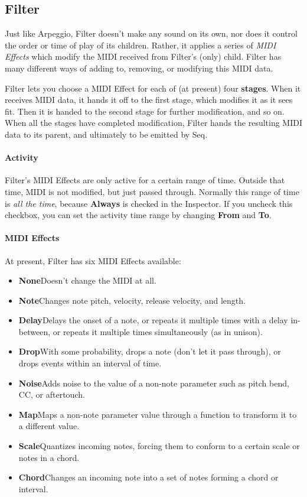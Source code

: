 \documentclass[twoside,10pt]{article}
\begin{document}
\subsection{Filter}

Just like Arpeggio, Filter doesn't make any sound on its own, nor does it control the order or time of play of its children.  Rather, it applies a series of {\it MIDI Effects} which modify the MIDI received from Filter's (only) child.  Filter has many different ways of adding to, removing, or modifying this MIDI data.  

Filter lets you choose a MIDI Effect for each of (at present) four {\bf stages}.  When it receives MIDI data, it hands it off to the first stage, which modifies it as it sees fit.  Then it is handed to the second stage for further modification, and so on.  When all the stages have completed modification, Filter hands the resulting MIDI data to its parent, and ultimately to be emitted by Seq.

\paragraph{Activity}

Filter's MIDI Effects are only active for a certain range of time.  Outside that time, MIDI is not modified, but just passed through.   Normally this range of time is {\it all the time}, because {\bf Always} is checked in the Inspector.  If you uncheck this checkbox, you can set the activity time range by changing {\bf From} and {\bf To}.  

\paragraph{MIDI Effects}

At present, Filter has six MIDI Effects available:

\begin{itemize}
\item {\bf None}\qquad Doesn't change the MIDI at all.
\item {\bf Note}\qquad Changes note pitch, velocity, release velocity, and length.
\item {\bf Delay}\qquad Delays the onset of a note, or repeats it multiple times with a delay in-between, or repeats it multiple times simultaneously (as in unison).
\item {\bf Drop}\qquad With some probability, drops a note (don't let it pass through), or drops events within an interval of time.
\item {\bf Noise}\qquad Adds noise to the value of a non-note parameter such as pitch bend, CC, or aftertouch.
\item {\bf Map}\qquad Maps a non-note parameter value through a function to transform it to a different value.
\item {\bf Scale}\qquad Quantizes incoming notes, forcing them to conform to a certain scale or notes in a chord.
\item {\bf Chord}\qquad Changes an incoming note into a set of notes forming a chord or interval.
\end{itemize}
\end{document}
